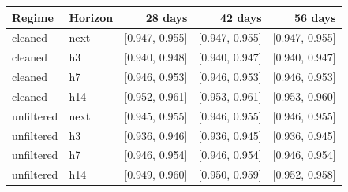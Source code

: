 \begin{tabular}{@{}llrrr@{}}\toprule
Regime & Horizon & 28 days & 42 days & 56 days\\\midrule
cleaned & next & [0.947, 0.955] & [0.947, 0.955] & [0.947, 0.955] \\
cleaned & h3 & [0.940, 0.948] & [0.940, 0.947] & [0.940, 0.947] \\
cleaned & h7 & [0.946, 0.953] & [0.946, 0.953] & [0.946, 0.953] \\
cleaned & h14 & [0.952, 0.961] & [0.953, 0.961] & [0.953, 0.960] \\
unfiltered & next & [0.945, 0.955] & [0.946, 0.955] & [0.946, 0.955] \\
unfiltered & h3 & [0.936, 0.946] & [0.936, 0.945] & [0.936, 0.945] \\
unfiltered & h7 & [0.946, 0.954] & [0.946, 0.954] & [0.946, 0.954] \\
unfiltered & h14 & [0.949, 0.960] & [0.950, 0.959] & [0.952, 0.958] \\
\bottomrule\end{tabular}
